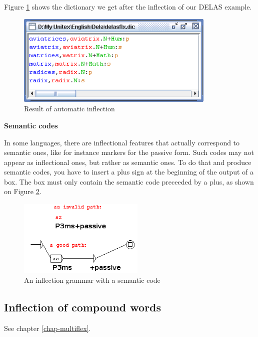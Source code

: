 \bigskip
\noindent Figure \ref{fig-inflection-result} shows the dictionary we get after the inflection of 
our DELAS example.

\bigskip
\begin{figure}[!ht]
\begin{center}
\includegraphics[width=9.5cm]{resources/img/fig3-9.png}
\caption{Result of automatic inflection\label{fig-inflection-result}}
\end{center}
\end{figure}

\bigskip
\noindent \textbf{Semantic codes}

\noindent In some languages, there are inflectional features that actually correspond to 
semantic ones, like for instance markers for the passive form. Such codes may not appear
as inflectional ones, but rather as semantic ones. To do that and produce semantic codes, 
you have to insert a plus sign at the beginning of the output of a box. The box must only 
contain the semantic code preceeded by a plus, as shown on Figure \ref{fig-inflection-sem}.

\bigskip
\begin{figure}[!ht]
\begin{center}
\includegraphics[width=6cm]{resources/img/fig3-9sem.png}
\caption{An inflection grammar with a semantic code\label{fig-inflection-sem}}
\end{center}
\end{figure}

\subsection{Inflection of compound words}
See chapter \ref{chap-multiflex}.


